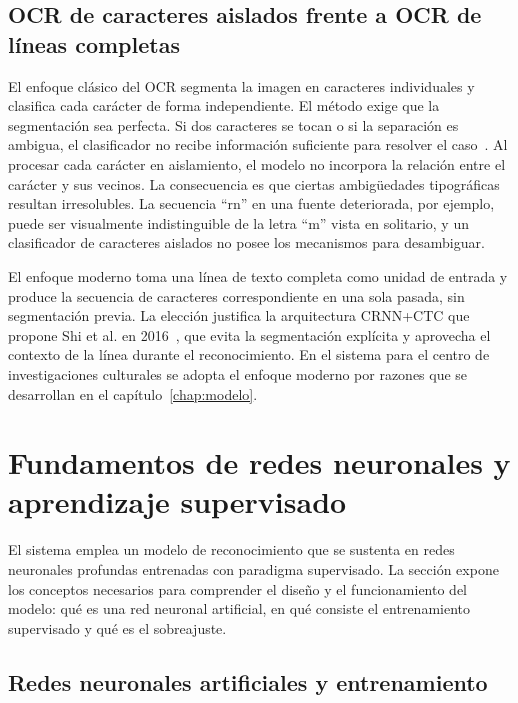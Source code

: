 \subsection{OCR de caracteres aislados frente a OCR de líneas completas}
\label{subsec:enfoques-ocr}

El enfoque clásico del OCR segmenta la imagen en caracteres individuales y clasifica cada carácter de forma independiente. El método exige que la segmentación sea perfecta. Si dos caracteres se tocan o si la separación es ambigua, el clasificador no recibe información suficiente para resolver el caso~\cite{smith2007tesseract,subramani2021survey}. Al procesar cada carácter en aislamiento, el modelo no incorpora la relación entre el carácter y sus vecinos. La consecuencia es que ciertas ambigüedades tipográficas resultan irresolubles. La secuencia ``rn'' en una fuente deteriorada, por ejemplo, puede ser visualmente indistinguible de la letra ``m'' vista en solitario, y un clasificador de caracteres aislados no posee los mecanismos para desambiguar.

El enfoque moderno toma una línea de texto completa como unidad de entrada y produce la secuencia de caracteres correspondiente en una sola pasada, sin segmentación previa. La elección justifica la arquitectura CRNN+CTC que propone Shi et al. en 2016~\cite{shi2016crnn}, que evita la segmentación explícita y aprovecha el contexto de la línea durante el reconocimiento. En el sistema para el centro de investigaciones culturales se adopta el enfoque moderno por razones que se desarrollan en el capítulo~\ref{chap:modelo}.

\section{Fundamentos de redes neuronales y aprendizaje supervisado}
\label{sec:redes-neuronales}

El sistema emplea un modelo de reconocimiento que se sustenta en redes neuronales profundas entrenadas con paradigma supervisado. La sección expone los conceptos necesarios para comprender el diseño y el funcionamiento del modelo: qué es una red neuronal artificial, en qué consiste el entrenamiento supervisado y qué es el sobreajuste.

\subsection{Redes neuronales artificiales y entrenamiento}

